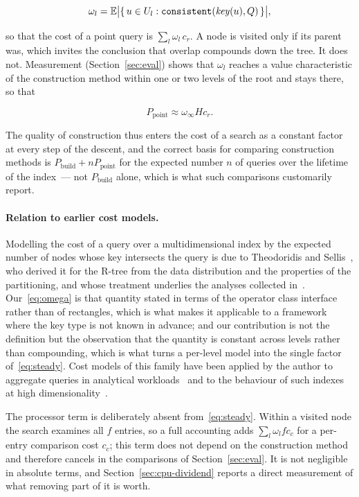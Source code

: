 \begin{equation}
\label{eq:omega}
\omega_l = \mathbb{E}\bigl|\{\,u \in U_l : \texttt{consistent}(\mathit{key}(u), Q)\,\}\bigr| ,
\end{equation}

so that the cost of a point query is $\sum_l \omega_l\, c_r$. A node is visited
only if its parent was, which invites the conclusion that overlap compounds down
the tree. It does not. Measurement (Section~\ref{sec:eval}) shows that $\omega_l$
reaches a value characteristic of the construction method within one or two
levels of the root and stays there, so that

\begin{equation}
\label{eq:steady}
P_{\text{point}} \approx \omega_\infty H c_r .
\end{equation}

The quality of construction thus enters the cost of a search as a constant
factor at every step of the descent, and the correct basis for comparing
construction methods is $P_{\text{build}} + n P_{\text{point}}$ for the expected
number $n$ of queries over the lifetime of the index~--- not $P_{\text{build}}$
alone, which is what such comparisons customarily report.

\paragraph{Relation to earlier cost models.} Modelling the cost of a query over
a multidimensional index by the expected number of nodes whose key intersects
the query is due to Theodoridis and Sellis~\cite{theodoridis1996model}, who
derived it for the R-tree from the data distribution and the properties of the
partitioning, and whose treatment underlies the analyses collected
in~\cite{manolopoulos2006rtrees}. Our~\eqref{eq:omega} is that quantity stated
in terms of the operator class interface rather than of rectangles, which is
what makes it applicable to a framework where the key type is not known in
advance; and our contribution is not the definition but the observation that the
quantity is constant across levels rather than compounding, which is what turns
a per-level model into the single factor of~\eqref{eq:steady}. Cost models of
this family have been applied by the author to aggregate queries in analytical
workloads~\cite{borodin2011estimation} and to the behaviour of such indexes at
high dimensionality~\cite{borodin2016highd}.

The processor term is deliberately absent from~\eqref{eq:steady}. Within a
visited node the search examines all $f$ entries, so a full accounting adds
$\sum_l \omega_l f c_c$ for a per-entry comparison cost $c_c$; this term does not
depend on the construction method and therefore cancels in the comparisons of
Section~\ref{sec:eval}. It is not negligible in absolute terms, and
Section~\ref{sec:cpu-dividend} reports a direct measurement of what removing part
of it is worth.

